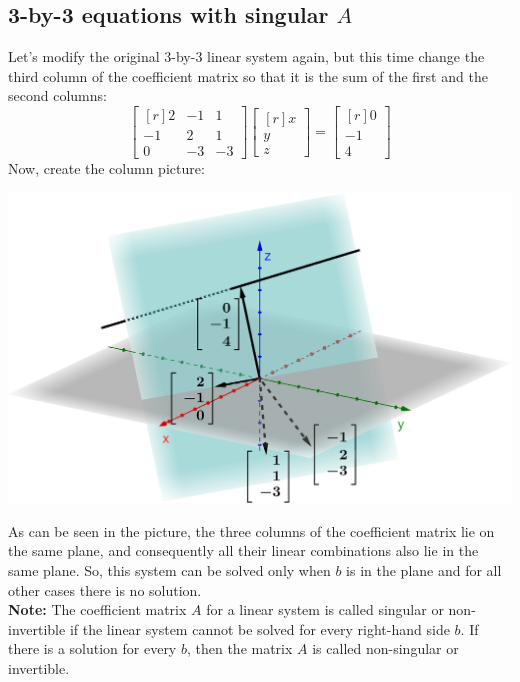 \documentclass[../main.tex]{subfiles}
\begin{document}
\subsection{3-by-3 equations with singular $A$}
Let's modify the original 3-by-3 linear system again, but this time change the third column of the coefficient matrix so that it is the sum of the first and the second columns:
\[
    \begin{bmatrix*}[r]
        2 & -1 & 1 \\
        -1 & 2 & 1 \\
        0 & -3 & -3
    \end{bmatrix*}
    \begin{bmatrix*}[r]
        x \\
        y \\
        z
    \end{bmatrix*}
    =
    \begin{bmatrix*}[r]
        0 \\
        -1 \\
        4
    \end{bmatrix*}
\]
Now, create the column picture:

\begingroup
\centering
\includegraphics[width = \columnwidth]{../figures/fig07_3d-singular-col-pic/geogebra-derived}
\par
\endgroup
As can be seen in the picture, the three columns of the coefficient matrix lie on the same plane, and consequently all their linear combinations also lie in the same plane. So, this system can be solved only when $b$ is in the plane and for all other cases there is no solution. \\

\textbf{Note:} The coefficient matrix $A$ for a linear system is called singular or non-invertible if the linear system cannot be solved for every right-hand side $b$. If there is a solution for every $b$, then the matrix $A$ is called non-singular or invertible. \\
\end{document}
